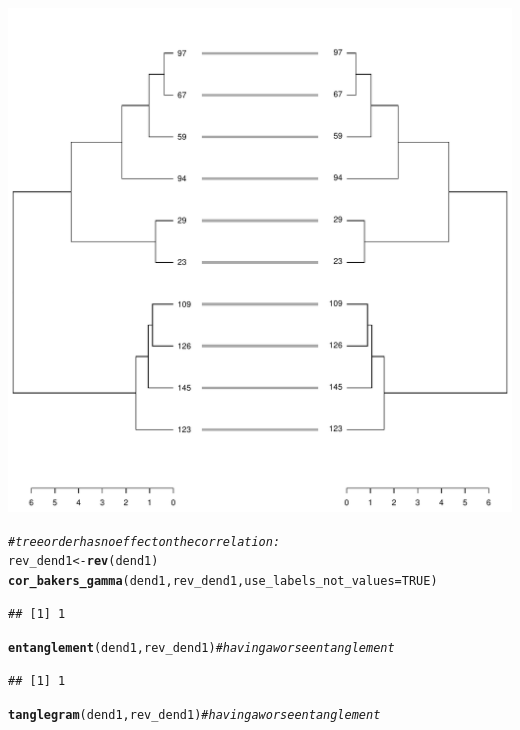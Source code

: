 \documentclass[shortnames,nojss,article]{jss}\usepackage[]{graphicx}\usepackage[]{color}
\makeatletter
\def\maxwidth{ %
  \ifdim\Gin@nat@width>\linewidth
    \linewidth
  \else
    \Gin@nat@width
  \fi
}
\newcommand{\hlnum}[1]{\textcolor[rgb]{0.686,0.059,0.569}{#1}}%
\newcommand{\hlcom}[1]{\textcolor[rgb]{0.678,0.584,0.686}{\textit{#1}}}%
\newcommand{\hlstd}[1]{\textcolor[rgb]{0.345,0.345,0.345}{#1}}%
\newcommand{\hlkwb}[1]{\textcolor[rgb]{0.69,0.353,0.396}{#1}}%
\newcommand{\hlkwc}[1]{\textcolor[rgb]{0.333,0.667,0.333}{#1}}%
\newcommand{\hlkwd}[1]{\textcolor[rgb]{0.737,0.353,0.396}{\textbf{#1}}}%
\newenvironment{kframe}{%
 \def\at@end@of@kframe{}%
 \ifinner\ifhmode%
  \def\at@end@of@kframe{\end{minipage}}%
  \begin{minipage}{\columnwidth}%
 \fi\fi%
 \def\FrameCommand##1{\hskip\@totalleftmargin \hskip-\fboxsep
 \colorbox{shadecolor}{##1}\hskip-\fboxsep
     \hskip-\linewidth \hskip-\@totalleftmargin \hskip\columnwidth}%
 \MakeFramed {\advance\hsize-\width
   \@totalleftmargin\z@ \linewidth\hsize
   \@setminipage}}%
 {\par\unskip\endMakeFramed%
 \at@end@of@kframe}
\newenvironment{knitrout}{}{} %
\makeatother
\begin{document}
\begin{knitrout}
{\centering \includegraphics[width=\maxwidth]{figure/cor_bakers_gamma_example_11} 

}


\begin{kframe}\begin{alltt}
\hlcom{# tree order has no effect on the correlation:}
\hlstd{rev_dend1} \hlkwb{<-} \hlkwd{rev}\hlstd{(dend1)}
\hlkwd{cor_bakers_gamma}\hlstd{(dend1, rev_dend1,} \hlkwc{use_labels_not_values} \hlstd{=} \hlnum{TRUE}\hlstd{)}
\end{alltt}
\begin{verbatim}
## [1] 1
\end{verbatim}
\begin{alltt}
\hlkwd{entanglement}\hlstd{(dend1, rev_dend1)}  \hlcom{# having a worse entanglement }
\end{alltt}
\begin{verbatim}
## [1] 1
\end{verbatim}
\begin{alltt}
\hlkwd{tanglegram}\hlstd{(dend1, rev_dend1)}  \hlcom{# having a worse entanglement }
\end{alltt}
\end{kframe}


\end{knitrout}
\end{document}
